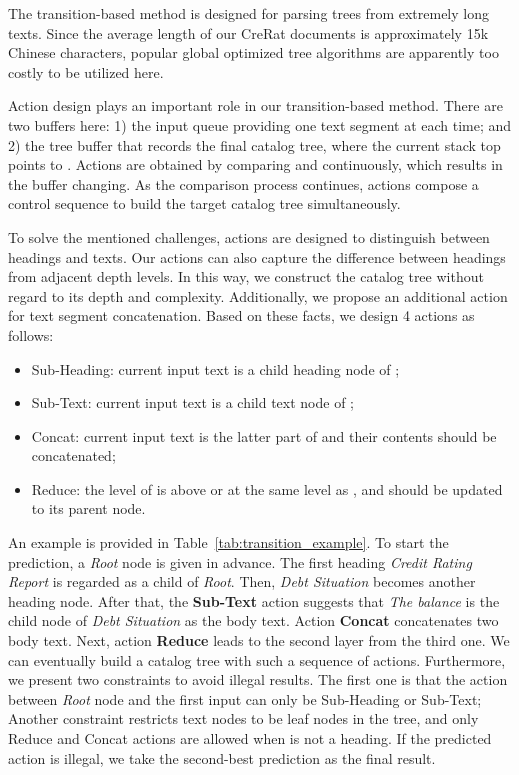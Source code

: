 \documentclass[runningheads]{llncs}
\begin{document}
The transition-based method is designed for parsing trees from extremely long texts.
Since the average length of our CreRat documents is approximately 15k Chinese characters, popular global optimized tree algorithms are apparently too costly to be utilized here.

Action design plays an important role in our transition-based method.
There are two buffers here: 1) the input queue  providing one text segment  at each time; and 2) the tree buffer  that records the final catalog tree, where the current stack top points to .
Actions are obtained by comparing  and  continuously, which results in the buffer changing.
As the comparison process continues, actions compose a control sequence to build the target catalog tree simultaneously.

To solve the mentioned challenges, actions are designed to distinguish between headings and texts. Our actions can also capture the difference between headings from adjacent depth levels. In this way, we construct the catalog tree without regard to its depth and complexity. Additionally, we propose an additional action for text segment concatenation.
Based on these facts, we design 4 actions as follows:
\begin{itemize}
    \item Sub-Heading: current input text  is a child heading node of ;
    \item Sub-Text: current input text  is a child text node of ;
    \item Concat: current input text  is the latter part of  and their contents should be concatenated;
    \item Reduce: the level of  is above or at the same level as , and  should be updated to its parent node.
\end{itemize}

An example is provided in Table~\ref{tab:transition_example}.
To start the prediction, a \textit{Root} node is given in advance.
The first heading \textit{Credit Rating Report} is regarded as a child of \textit{Root}. Then, \textit{Debt Situation} becomes another heading node. After that, the \textbf{Sub-Text} action suggests that \textit{The balance} is the child node of \textit{Debt Situation} as the body text. Action \textbf{Concat} concatenates two body text. Next, action \textbf{Reduce} leads to the second layer from the third one. We can eventually build a catalog tree with such a sequence of actions.
Furthermore, we present two constraints to avoid illegal results.
The first one is that the action between \textit{Root} node and the first input  can only be Sub-Heading or Sub-Text; Another constraint restricts text nodes to be leaf nodes in the tree, and only Reduce and Concat actions are allowed when  is not a heading.
If the predicted action is illegal, we take the second-best prediction as the final result.
\end{document}
